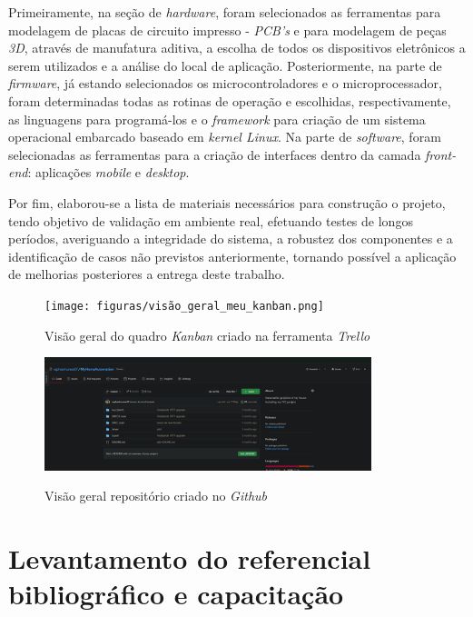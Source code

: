 Primeiramente, na seção de \textit{hardware}, foram selecionados as ferramentas para modelagem de placas de circuito impresso - \textit{PCB's} e para modelagem de peças \textit{3D}, através de manufatura aditiva, a escolha de todos os dispositivos eletrônicos a serem utilizados e a análise do local de aplicação. Posteriormente, na parte de \textit{firmware}, já estando selecionados os microcontroladores e o microprocessador, foram determinadas todas as rotinas de operação e escolhidas, respectivamente, as linguagens para programá-los e o \textit{framework} para criação de um sistema operacional embarcado baseado em \textit{kernel Linux}. Na parte de \textit{software}, foram selecionadas as ferramentas para a criação de interfaces dentro da camada \textit{front-end}: aplicações \textit{mobile} e \textit{desktop}.

Por fim, elaborou-se a lista de materiais necessários para construção o projeto, tendo objetivo de validação em ambiente real, efetuando testes de longos períodos, averiguando a integridade do sistema, a robustez dos componentes e a identificação de casos não previstos anteriormente, tornando possível a aplicação de melhorias posteriores a entrega deste trabalho.

\begin{figure}[H]
	\centering
	\caption{Visão geral do quadro \textit{Kanban} criado na ferramenta \textit{Trello}}
	\texttt{[image: figuras/visão\_geral\_meu\_kanban.png]}
	\label{fig:kanban-proj}
\end{figure}


\begin{figure}[H]
	\centering
	\caption{Visão geral repositório criado no \textit{Github}}
	\includegraphics[width=0.85\textwidth]{figuras/github.png}
	\label{fig:github}
\end{figure}



\section{Levantamento do referencial bibliográfico e capacitação}
\label{sec:metmodal}

